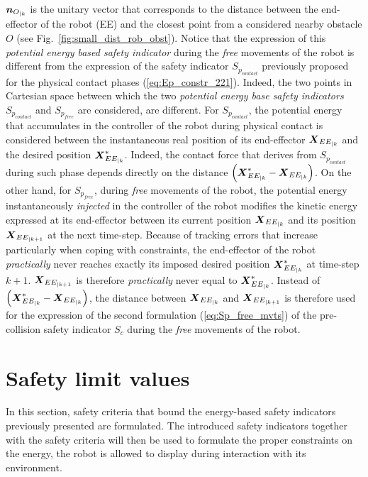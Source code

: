 $\mbox{\boldmath${n}$}_{O_{|k}}$ is the unitary vector that corresponds to the distance between the end-effector of the robot (EE) and the closest point from a considered nearby obstacle $O$ (see Fig.~\ref{fig:small_dist_rob_obst}). Notice that the expression of this \textit{potential energy based safety indicator} during the \textit{free} movements of the robot is different from the expression of the safety indicator $S_{p_{contact}}$ previously proposed for the physical contact phases (\ref{eq:Ep_constr_221}). Indeed, the two points in Cartesian space between which the two \textit{potential energy base safety indicators} $S_{p_{contact}}$ and $S_{p_{free}}$ are considered, are different. For $S_{p_{contact}}$, the potential energy that accumulates in the controller of the robot during physical contact is considered between the instantaneous real position of its end-effector $\mbox{\boldmath${X}$}_{EE_{|k}}$ and the desired position $\mbox{\boldmath${X}$}_{EE_{|k}}^*$. Indeed, the contact force that derives from $S_{p_{contact}}$ during such phase depends directly on the distance $\left(\mbox{\boldmath${X}$}_{EE_{|k}}^*-\mbox{\boldmath${X}$}_{EE_{|k}}\right)$. On the other hand, for $S_{p_{free}}$, during \textit{free} movements of the robot, the potential energy instantaneously \textit{injected} in the controller of the robot modifies the kinetic energy expressed at its end-effector between its current  position $\mbox{\boldmath${X}$}_{EE_{|k}}$ and its position $\mbox{\boldmath${X}$}_{EE_{|k+1}}$ at the next time-step. Because of tracking errors that increase particularly when coping with constraints, the end-effector of the robot \textit{practically} never reaches exactly its imposed desired position $\mbox{\boldmath${X}$}_{EE_{|k}}^*$ at time-step $k+1$.  $\mbox{\boldmath${X}$}_{EE_{|k+1}}$ is therefore \textit{practically} never equal to $\mbox{\boldmath${X}$}_{EE_{|k}}^*$. Instead of $\left(\mbox{\boldmath${X}$}_{EE_{|k}}^*-\mbox{\boldmath${X}$}_{EE_{|k}}\right)$, the distance between $\mbox{\boldmath${X}$}_{EE_{|k}}$ and $\mbox{\boldmath${X}$}_{EE_{|k+1}}$ is therefore used for the expression of the second formulation (\ref{eq:Sp_free_mvts}) of the pre-collision safety indicator $S_c$ during the \textit{free} movements of the robot.
\section{Safety limit values}
\label{sec:salimval1}
In this section, safety criteria that bound the energy-based safety indicators previously presented are formulated. The introduced safety indicators together with the safety criteria will then be used to formulate the proper constraints on the energy, the robot is allowed to display during interaction with its environment.
